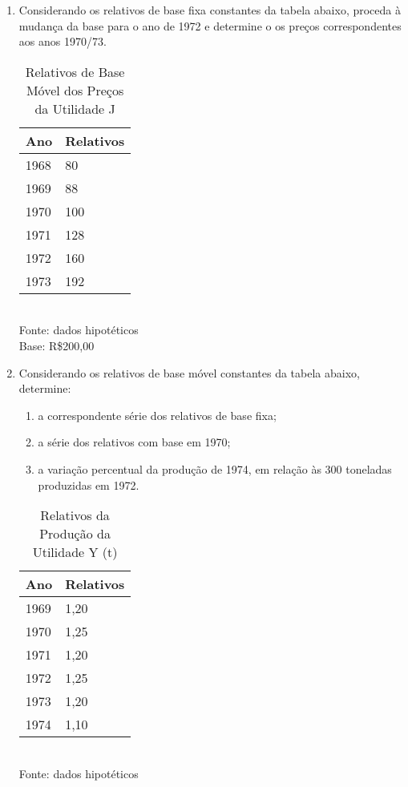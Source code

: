 \begin{enumerate}[resume]
\item Considerando os relativos de base fixa constantes da tabela abaixo, proceda à mudança da base para o ano de 1972 e determine o os preços correspondentes aos anos 1970/73.
	\begin{table}[!htb]
	\centering
	\caption{Relativos de Base Móvel dos Preços da Utilidade J}
	\begin{tabular}{ll}
	Ano & Relativos \\
	\hline 
	1968 & 80  \\
	1969 & 88  \\
	1970 & 100  \\
	1971 & 128  \\
	1972 & 160  \\
	1973 & 192  \\		
	\end{tabular} 
	\\ Fonte: dados hipotéticos\\
	Base: R\$200,00
	\end{table}
	
\item Considerando os relativos de base móvel constantes da tabela abaixo, determine:
	\begin{enumerate}
	\item a correspondente série dos relativos de base fixa;
	\item a série dos relativos com base em 1970;
	\item a variação percentual da produção de 1974, em relação às 300 toneladas produzidas em 1972.
	\end{enumerate}
	\begin{table}[!htb]
	\centering
	\caption{Relativos da Produção da Utilidade Y (t)}
	\begin{tabular}{ll}
	Ano & Relativos \\
	\hline 
	1969 & 1,20  \\
	1970 & 1,25  \\
	1971 & 1,20 \\
	1972 & 1,25  \\
	1973 & 1,20  \\		
	1974 & 1,10  \\		
	\end{tabular} 
	\\ Fonte: dados hipotéticos
	\end{table}


\end{enumerate}
